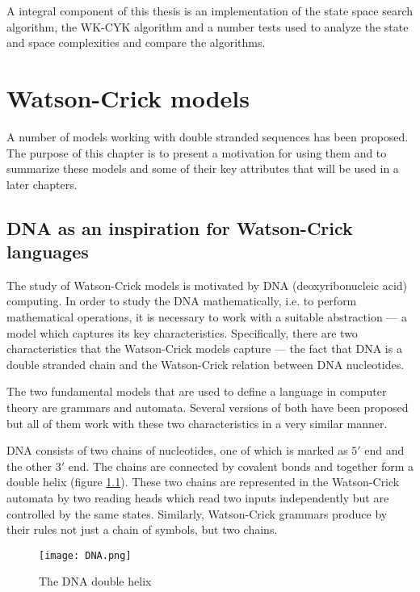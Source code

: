 A integral component of this thesis is an implementation of the state space search algorithm, the WK-CYK algorithm and a number tests used to analyze the state and space complexities and compare the algorithms.

\chapter{Watson-Crick models} \label{chapter:models}
A number of models working with double stranded sequences has been proposed. The purpose of this chapter is to present a motivation for using them and to summarize these models and some of their key attributes that will be used in a later chapters.

\section{DNA as an inspiration for Watson-Crick languages}
The study of Watson-Crick models is motivated by DNA (deoxyribonucleic acid) computing. In order to study the DNA mathematically, i.e. to perform mathematical operations, it is necessary to work with a suitable abstraction --- a model which captures its key characteristics. Specifically, there are two characteristics that the Watson-Crick models capture --- the fact that DNA is a double stranded chain and the Watson-Crick relation between DNA nucleotides.

The two fundamental models that are used to define a language in computer theory are grammars and automata. Several versions of both have been proposed but all of them work with these two characteristics in a very similar manner.

DNA consists of two chains of nucleotides, one of which is marked as $5'$ end and the other $3'$ end. The chains are connected by covalent bonds and together form a double helix (figure \ref{fig:dna}). These two chains are represented in the Watson-Crick automata by two reading heads which read two inputs independently but are controlled by the same states. Similarly, Watson-Crick grammars produce by their rules not just a chain of symbols, but two chains.

\begin{figure}[ht]
  \texttt{[image: DNA.png]}
  \centering
  \label{fig:dna}
  \caption{The DNA double helix}
\end{figure}

